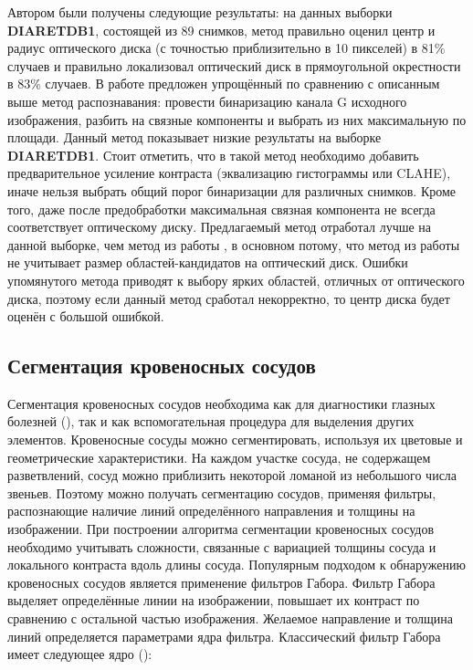 \documentclass[12pt,fleqn]{article}
\begin{document}
Автором были получены следующие результаты: на данных выборки \linebreak \textbf{DIARETDB1}, состоящей из 89 снимков, метод правильно оценил центр и радиус оптического диска (с точностью приблизительно в 10 пикселей) в 81\% случаев и правильно локализовал оптический диск в прямоугольной окрестности в 83\% случаев. В работе \cite{jose} предложен упрощённый по сравнению с описанным выше метод распознавания: провести бинаризацию канала G исходного изображения, разбить на связные компоненты и выбрать из них максимальную по площади. Данный метод показывает низкие результаты на выборке \textbf{DIARETDB1}. Стоит отметить, что в такой метод необходимо добавить предварительное усиление контраста (эквализацию гистограммы или CLAHE), иначе нельзя выбрать общий порог бинаризации для различных снимков. Кроме того, даже после предобработки максимальная связная компонента не всегда соответствует оптическому диску. Предлагаемый метод отработал лучше на данной выборке, чем метод из работы \cite{huiqi_li}, в основном потому, что метод из работы \cite{huiqi_li} не учитывает размер областей-кандидатов на оптический диск. Ошибки упомянутого метода приводят к выбору ярких областей, отличных от оптического диска, поэтому если данный метод сработал некорректно, то центр диска будет оценён с большой ошибкой. 

\subsection{Сегментация кровеносных сосудов}
\label{vessels_segmentation}

Сегментация кровеносных сосудов необходима как для диагностики глазных болезней (\cite{medical_dr}), так и как вспомогательная процедура для выделения других элементов. Кровеносные сосуды можно сегментировать, используя их цветовые и геометрические характеристики. На каждом участке сосуда, не содержащем разветвлений, сосуд можно приблизить некоторой ломаной из небольшого числа звеньев. Поэтому можно получать сегментацию сосудов, применяя фильтры, распознающие наличие линий определённого направления и толщины на изображении. При построении алгоритма сегментации кровеносных сосудов необходимо учитывать сложности, связанные с вариацией толщины сосуда и локального контраста вдоль длины сосуда. Популярным подходом к обнаружению кровеносных сосудов является применение фильтров Габора. Фильтр Габора выделяет определённые линии на изображении, повышает их контраст по сравнению с остальной частью изображения. Желаемое направление и толщина линий определяется параметрами ядра фильтра. Классический фильтр Габора имеет следующее ядро (\cite{qui_li}):
\end{document}
